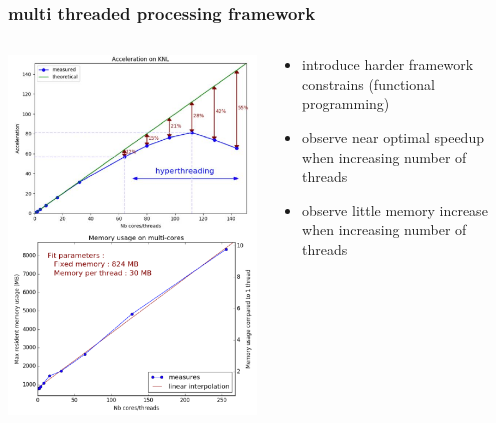 \documentclass[table,xcolor=dvipsnames,professionalfonts]{beamer}
\begin{document}
\begin{frame}
  \frametitle{multi threaded processing framework}
  \begin{columns}
    \begin{column}{.45\textwidth}
      \includegraphics[width=\textwidth]{./thread.pdf}
    \end{column}
    \begin{column}{.55\textwidth}
      \begin{itemize}
        \item introduce harder framework constrains
            \newline (functional programming)
            \item observe near optimal speedup when increasing number of threads
            \item observe little memory increase when increasing number of threads
      \end{itemize}
    \end{column}
    \end{columns}
\end{frame}
\end{document}
